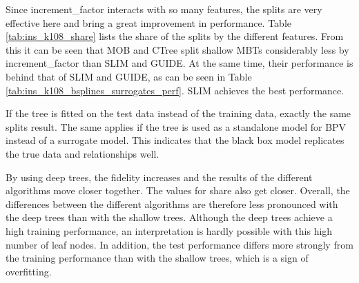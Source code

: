 Since increment\_factor interacts with so many features, the splits are very effective here and bring a great improvement in performance. Table \ref{tab:ins_k108_share} lists the share of the splits by the different features. From this it can be seen that MOB and CTree split shallow MBTs considerably less by increment\_factor than SLIM and GUIDE. At the same time, their performance is behind that of SLIM and GUIDE, as can be seen in Table \ref{tab:ins_k108_bsplines_surrogates_perf}. SLIM achieves the best performance.


If the tree is fitted on the test data instead of the training data, exactly the same splits result. The same applies if the tree is used as a standalone model for BPV instead of a surrogate model. This indicates that the black box model replicates the true data and relationships well.




By using deep trees, the fidelity increases and the results of the different algorithms move closer together. The values for share also get closer. Overall, the differences between the different algorithms are therefore less pronounced with the deep trees than with the shallow trees. Although the deep trees achieve a high training performance, an interpretation is hardly possible with this high number of leaf nodes. In addition, the test performance differs more strongly from the training performance than with the shallow trees, which is a sign of overfitting.



